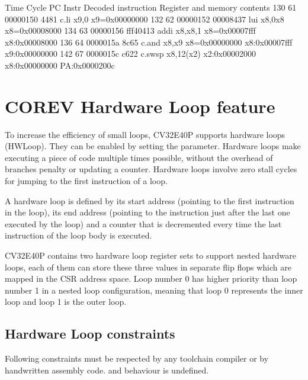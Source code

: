 \documentclass[letterpaper,10pt,english]{sphinxmanual}
\begin{document}
\begin{sphinxVerbatim}[commandchars=\\\{\}]
Time Cycle PC       Instr    Decoded instruction Register and memory contents
 130    61 00000150 4481     c.li    x9,0        x9=0x00000000
 132    62 00000152 00008437 lui     x8,0x8      x8=0x00008000
 134    63 00000156 fff40413 addi    x8,x8,\PYGZhy{}1    x8=0x00007fff  x8:0x00008000
 136    64 0000015a 8c65     c.and   x8,x9       x8=0x00000000  x8:0x00007fff  x9:0x00000000
 142    67 0000015c c622     c.swsp  x8,12(x2)   x2:0x00002000  x8:0x00000000 PA:0x0000200c
\end{sphinxVerbatim}

\sphinxstepscope


\chapter{CORE\sphinxhyphen{}V Hardware Loop feature}
\label{\detokenize{corev_hw_loop:core-v-hardware-loop-feature}}\label{\detokenize{corev_hw_loop:hwloop-specs}}\label{\detokenize{corev_hw_loop::doc}}
\sphinxAtStartPar
To increase the efficiency of small loops, CV32E40P supports hardware
loops (HWLoop). They can be enabled by setting the  parameter.
Hardware loops make executing a piece of code
multiple times possible, without the overhead of branches penalty or updating a counter.
Hardware loops involve zero stall cycles for jumping to the first
instruction of a loop.

\sphinxAtStartPar
A hardware loop is defined by its start address (pointing to the first
instruction in the loop), its end address (pointing to the instruction
just after the last one executed by the loop) and a counter that is
decremented every time the last instruction of the loop body is executed.

\sphinxAtStartPar
CV32E40P contains two hardware loop register sets to support nested hardware loops,
each of them can store these three values in separate flip flops which are
mapped in the CSR address space.
Loop number 0 has higher priority than loop number 1 in a nested loop
configuration, meaning that loop 0 represents the inner loop and loop 1 is the outer loop.


\section{Hardware Loop constraints}
\label{\detokenize{corev_hw_loop:hardware-loop-constraints}}
\sphinxAtStartPar
Following constraints must be respected by any toolchain compiler or by hand\sphinxhyphen{}written assembly code.
 and behaviour is undefined.
\end{document}
